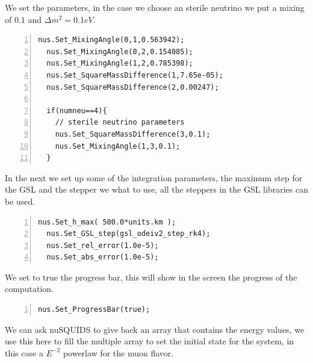 We set the parameters, in the case we choose an sterile neutrino we
put a mixing of $0.1$ and $\Delta m^2=0.1eV$.
\begin{lstlisting}[frame=leftline, numbers = left,breaklines=true,label = ex:sin1,firstnumber=last]
  nus.Set_MixingAngle(0,1,0.563942);
  nus.Set_MixingAngle(0,2,0.154085);
  nus.Set_MixingAngle(1,2,0.785398);
  nus.Set_SquareMassDifference(1,7.65e-05);
  nus.Set_SquareMassDifference(2,0.00247);

  if(numneu==4){
    // sterile neutrino parameters
    nus.Set_SquareMassDifference(3,0.1);
    nus.Set_MixingAngle(1,3,0.1);
  }
\end{lstlisting}
In the next we set up some of the integration parameters, the maximum
step for the GSL and the stepper we what to use, all the steppers in
the GSL libraries can be used.
\begin{lstlisting}[frame=leftline, numbers = left,breaklines=true,label = ex:sin1,firstnumber=last]
  nus.Set_h_max( 500.0*units.km );
  nus.Set_GSL_step(gsl_odeiv2_step_rk4);
  nus.Set_rel_error(1.0e-5);
  nus.Set_abs_error(1.0e-5);
\end{lstlisting}
We set to true the progress bar, this will show in the screen the
progress of the computation.
\begin{lstlisting}[frame=leftline, numbers = left,breaklines=true,label = ex:sin1,firstnumber=last]
  nus.Set_ProgressBar(true);
\end{lstlisting}
We can ask nuSQUIDS to give back an array that contains the energy
values, we use this here to fill the multiple array to set the initial
state for the system, in this case a $E^{-2}$ powerlaw for the muon
flavor.
 
